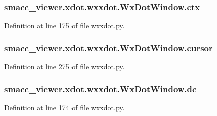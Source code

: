 \subsubsection[{\texorpdfstring{ctx}{ctx}}]{\setlength{\rightskip}{0pt plus 5cm}smacc\+\_\+viewer.\+xdot.\+wxxdot.\+Wx\+Dot\+Window.\+ctx}\hypertarget{classsmacc__viewer_1_1xdot_1_1wxxdot_1_1WxDotWindow_aef6feb5be3e3f8af14c96605f09a1168}{}\label{classsmacc__viewer_1_1xdot_1_1wxxdot_1_1WxDotWindow_aef6feb5be3e3f8af14c96605f09a1168}


Definition at line 175 of file wxxdot.\+py.

\subsubsection[{\texorpdfstring{cursor}{cursor}}]{\setlength{\rightskip}{0pt plus 5cm}smacc\+\_\+viewer.\+xdot.\+wxxdot.\+Wx\+Dot\+Window.\+cursor}\hypertarget{classsmacc__viewer_1_1xdot_1_1wxxdot_1_1WxDotWindow_ab66a264a4b8e60a95001daf5b393db86}{}\label{classsmacc__viewer_1_1xdot_1_1wxxdot_1_1WxDotWindow_ab66a264a4b8e60a95001daf5b393db86}


Definition at line 275 of file wxxdot.\+py.

\subsubsection[{\texorpdfstring{dc}{dc}}]{\setlength{\rightskip}{0pt plus 5cm}smacc\+\_\+viewer.\+xdot.\+wxxdot.\+Wx\+Dot\+Window.\+dc}\hypertarget{classsmacc__viewer_1_1xdot_1_1wxxdot_1_1WxDotWindow_aa04d1fb9f67bc7383a3d551e8d38ee0f}{}\label{classsmacc__viewer_1_1xdot_1_1wxxdot_1_1WxDotWindow_aa04d1fb9f67bc7383a3d551e8d38ee0f}


Definition at line 174 of file wxxdot.\+py.

